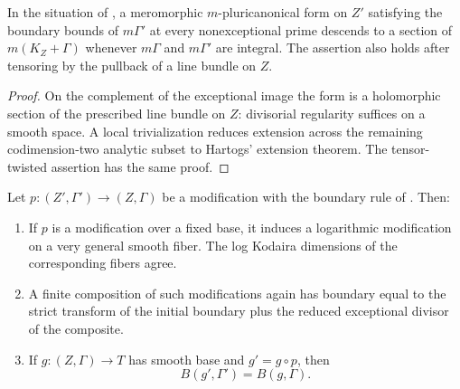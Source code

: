 \begin{corollary}
\label{setup:exceptional-descent}
In the situation of , a meromorphic
$m$-pluricanonical form on $Z'$ satisfying the boundary bounds of
$m\Gamma'$ at every nonexceptional prime descends to a section of
$m(K_Z+\Gamma)$ whenever $m\Gamma$ and $m\Gamma'$ are integral.
The assertion also holds after tensoring by the pullback of a line
bundle on $Z$.
\end{corollary}

\begin{proof}
On the complement of the exceptional image the form is a holomorphic
section of the prescribed line bundle on $Z$: divisorial regularity
suffices on a smooth space. A local trivialization reduces extension
across the remaining codimension-two analytic subset to Hartogs'
extension theorem. The tensor-twisted assertion has the same proof.
\end{proof}

\begin{corollary}
\label{setup:modification-compatibility}
Let $p:(Z',\Gamma')\to(Z,\Gamma)$ be a modification with the boundary
rule of . Then:
\begin{enumerate}[label=\textup{(\roman*)}]
\item If $p$ is a modification over a fixed base, it induces a
logarithmic modification on a very general smooth fiber. The log
Kodaira dimensions of the corresponding fibers agree.
\item A finite composition of such modifications again has boundary
equal to the strict transform of the initial boundary plus the reduced
exceptional divisor of the composite.
\item If $g:(Z,\Gamma)\to T$ has smooth base and $g'=g\circ p$, then
\begin{equation}\label{setup:fixed-base-boundary}
 B(g',\Gamma')=B(g,\Gamma).
\end{equation}
\end{enumerate}
\end{corollary}

